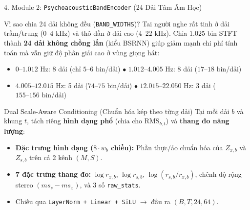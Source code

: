 \documentclass[aspectratio=169,10pt]{beamer}
\begin{document}
\begin{frame}{4. Module 2: \texttt{PsychoacousticBandEncoder} (24 Dải Tâm Âm Học)}
  \footnotesize
  \begin{block}{Vì sao chia 24 dải không đều (\texttt{BAND\_WIDTHS})?}
    Tai người nghe rất tinh ở dải trầm/trung ($0\text{--}4\text{ kHz}$) và thô dần ở dải cao ($4\text{--}22\text{ kHz}$). Chia $1.025$ bin STFT thành \textbf{24 dải không chồng lấn} (kiểu BSRNN) giúp giảm mạnh chi phí tính toán mà vẫn giữ độ phân giải cao ở vùng giọng hát:
    \begin{itemize}
      \item $0 \text{--} 1.012\text{ Hz}$: 8 dải (chỉ $5\text{--}6\text{ bin}$/dải) \quad $\bullet$ \quad $1.012 \text{--} 4.005\text{ Hz}$: 8 dải ($17\text{--}18\text{ bin}$/dải)
      \item $4.005 \text{--} 12.015\text{ Hz}$: 5 dải ($74\text{--}75\text{ bin}$/dải) \quad $\bullet$ \quad $12.015 \text{--} 22.050\text{ Hz}$: 3 dải ($155\text{--}156\text{ bin}$/dải)
    \end{itemize}
  \end{block}
  \begin{exampleblock}{Dual Scale-Aware Conditioning (Chuẩn hóa kép theo từng dải)}
    Tại mỗi dải $b$ và khung $t$, tách riêng \textbf{hình dạng phổ} (chia cho $\text{RMS}_{b,t}$) và \textbf{thang đo năng lượng}:
    \begin{itemize}
      \item \textbf{Đặc trưng hình dạng ($8 \cdot w_b$ chiều):} Phần thực/ảo chuẩn hóa của $Z_{x,b}$ và $Z_{s,b}$ trên cả 2 kênh $(M, S)$.
      \item \textbf{7 đặc trưng thang đo:} $\log r_{x,b}$, $\log r_{s,b}$, $\log(r_{s,b}/r_{x,b})$, chênh độ rộng stereo $(ms_s - ms_x)$, và 3 số \texttt{raw\_stats}.
      \item Chiếu qua \texttt{LayerNorm + Linear + SiLU} $\rightarrow$ đầu ra \textbf{$(B, T, 24, 64)$}.
    \end{itemize}
  \end{exampleblock}
\end{frame}
\end{document}
